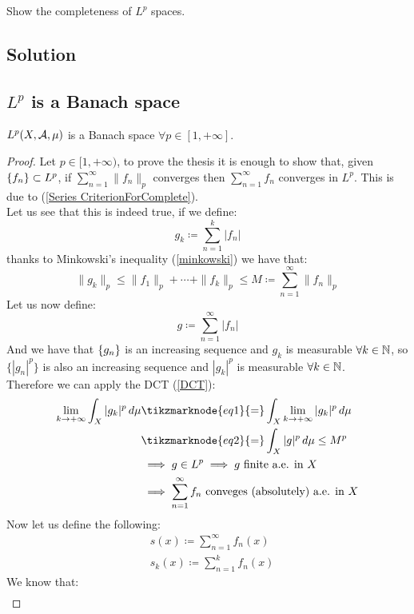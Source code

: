 \question
Show the completeness of $L^p$ spaces.

\subsection*{Solution}

\subsection{\texorpdfstring{$L^p$}{Lp} is a Banach space}
$L^p(X,\mathcal{A},\mu)$ is a Banach space $\forall p\in[1,+\infty]$.

\begin{proof}
    Let $p\in[1,+\infty)$, to prove the thesis it is enough to show that, given $\{ f_n \}\subset L^p$, if $\sum_{n=1}^\infty \|f_n\|_p$ converges then $\sum_{n=1}^\infty f_n$ converges in $L^p$. This is due to (\ref{Series CriterionForComplete}).\\
    Let us see that this is indeed true, if we define:
    \[ g_k \coloneqq \sum_{n=1}^k |f_n| \]
    thanks to Minkowski's inequality (\ref{minkowski}) we have that:
    \[ \|g_k\|_p \leq \|f_1\|_p + \cdots + \|f_k\|_p \leq M \coloneqq \sum_{n=1}^\infty \|f_n\|_p \]
    Let us now define:
    \[ g \coloneqq \sum_{n=1}^\infty |f_n|\]
    And we have that $\{ g_n \}$ is an increasing sequence and $g_k$ is measurable $\forall k\in\mathbb{N}$, so $\{|g_n|^p\}$ is also an increasing sequence and $|g_k|^p$ is measurable $\forall k \in \mathbb{N}$.\\
    Therefore we can apply the DCT (\ref{DCT}):
    \begin{align*}
        \lim_{k\to +\infty} \int_X |g_k|^p \, d\mu &\tikzmarknode{eq1}{=} \int_X \lim_{k\to +\infty} |g_k|^p \, d\mu \\
        &\tikzmarknode{eq2}{=} \int_X |g|^p \, d\mu \leq M^p \\
        & \implies g \in L^p \implies g \text{ finite a.e. in } X \\
        & \implies \sum_{n=1}^\infty f_n \text{ conveges (absolutely) a.e. in } X
    \end{align*}
    Now let us define the following:
    \begin{align*}
        & s(x) \coloneqq \sum_{n=1}^\infty f_n(x) \\
        & s_k(x) \coloneqq \sum_{n=1}^k f_n(x)
    \end{align*}   
    We know that:
    \begin{align*}

\end{align*}
\end{proof}
